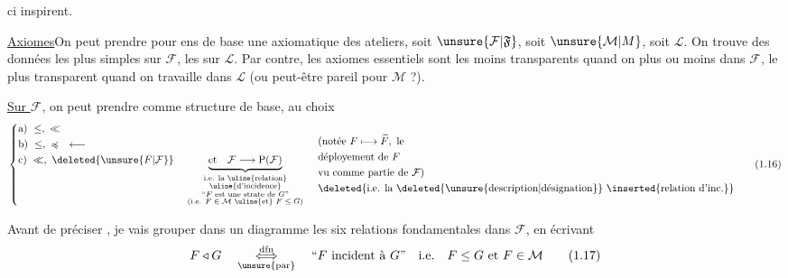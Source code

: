 %
ci inspirent.

\uline{Axiomes}\quad On peut prendre pour ens de base  une axiomatique des ateliers, soit $\unsure{\mathcal{F}|\mathfrak{F}}$, soit $\unsure{\mathcal{M}|M}$, soit $\mathcal{L}$. On trouve des données les plus simples sur $\mathcal{F}$, les   sur $\mathcal{L}$. Par contre, les axiomes essentiels sont les moins transparents quand on  plus ou moins dans $\mathcal{F}$, le plus transparent quand on travaille dans $\mathcal{L}$ (ou peut-être pareil pour $\mathcal{M}$ ?).

\uline{Sur $\mathcal{F}$}, on peut prendre comme structure de base, au choix
\[
\left\{\begin{aligned}
 &\text{a)}\ \leq,\ \ll\\
 &\text{b)}\ \leq,\ \preccurlyeq \quad \longleftarrow\\
 &\text{c)}\ \ll,\ \deleted{\unsure{F|\mathcal F}}\quad
 \underbrace{\text{et}\quad\mathcal{F}\longrightarrow\mathrm{P}(\mathcal{F})}_{
 \begin{smallmatrix}
 \text{i.e. la \uline{relation}}\\[-1pt]
 \text{\uline{d'incidence}}\\
 \text{``$F$ est une strate de $G$''}\\
 \text{(i.e. $F\in\mathcal{M}$ \uline{et} $F\leq G$)}
 \end{smallmatrix}}
\end{aligned}\right.
\quad
\begin{aligned}
 &\text{(notée }F\longmapsto\widetilde F,\ \text{le}\\
 &\text{déployement de }F\\
 &\text{vu comme partie de }\mathcal{F}\text{)}\\
 &\text{\deleted{i.e. la \deleted{\unsure{description|désignation}} \inserted{relation d'inc.}}}
\end{aligned}
\tag*{(1.16)}
\]

 Avant de préciser , je vais grouper dans un diagramme les six relations fondamentales dans $\mathcal{F}$, en écrivant
\[
F\triangleleft G\quad
\underset{\unsure{\mathrm{par}}}{\overset{\mathrm{dfn}}{\Longleftrightarrow}}\quad
\text{``$F$ incident à $G$''}\quad\text{i.e.}\quad F\leq G\ \text{et}\ F\in\mathcal{M}
\tag*{(1.17)}
\]
